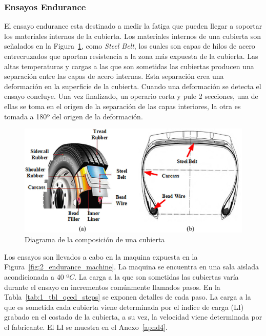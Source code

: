 \subsubsection{Ensayos Endurance}
El ensayo endurance esta destinado a medir la fatiga
que pueden llegar a soportar los materiales internos de la cubierta.
Los materiales internos de una cubierta son señalados
en la Figura~\ref{fig:2_tirecs}, como \textit{Steel Belt},
los cuales son capas de hilos de acero entrecruzados que
aportan resistencia a la zona más expuesta de la cubierta.
Las altas temperaturas y cargas a las que son sometidas las cubiertas
producen una separación entre las capas de acero internas.
Esta separación crea una deformación en la superficie de la cubierta.
Cuando una deformación se detecta el ensayo concluye.
Una vez finalizado, un operario corta y pule 2 secciones,
una de ellas se toma en el origen de la separación de las capas interiores,
la otra es tomada a 180º del origen de la deformación.

\begin{figure}[H]
	\begin{center}
		\includegraphics[width=\textwidth]{fig/2_tirecs}
	\end{center}
	\caption{Diagrama de la composición de una cubierta}
	\label{fig:2_tirecs}
\end{figure}

Los ensayos son llevados a cabo en la maquina expuesta
en la Figura~\ref{fig:2_endurance_machine}.
La maquina se encuentra en una sala aislada acondicionada a 40 º$C$.
La carga a la que son sometidas las cubiertas varía durante el ensayo
en incrementos comúnmente llamados pasos.
En la Tabla~\ref{tab:1_tbl_qced_steps} se exponen detalles de cada paso.
La carga a la que es sometida cada cubierta viene determinada
por el indice de carga (LI) grabado en el costado de la cubierta,
a su vez, la velocidad viene determinada por el fabricante.
El LI se muestra en el Anexo~\ref{apnd4}.

